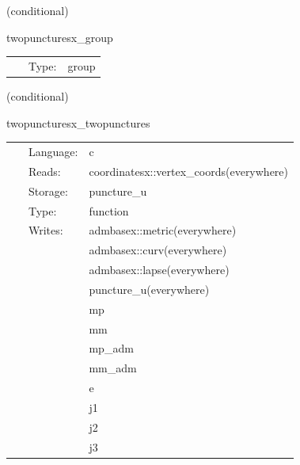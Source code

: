\vspace{5mm}

   (conditional) 

\hspace{5mm} twopuncturesx\_group 

\hspace{5mm}{\it twopuncturesx initial data group } 


\hspace{5mm}

 \begin{tabular*}{160mm}{cll} 
~ & Type:  & group \\ 
\end{tabular*} 


\vspace{5mm}

   (conditional) 

\hspace{5mm} twopuncturesx\_twopunctures 

\hspace{5mm}{\it create puncture black hole initial data } 


\hspace{5mm}

 \begin{tabular*}{160mm}{cll} 
~ & Language:  & c \\ 
~ & Reads:  & coordinatesx::vertex\_coords(everywhere) \\ 
~ & Storage:  & puncture\_u \\ 
~ & Type:  & function \\ 
~ & Writes:  & admbasex::metric(everywhere) \\ 
~& ~ &admbasex::curv(everywhere)\\ 
~& ~ &admbasex::lapse(everywhere)\\ 
~& ~ &puncture\_u(everywhere)\\ 
~& ~ &mp\\ 
~& ~ &mm\\ 
~& ~ &mp\_adm\\ 
~& ~ &mm\_adm\\ 
~& ~ &e\\ 
~& ~ &j1\\ 
~& ~ &j2\\ 
~& ~ &j3\\ 
\end{tabular*} 


\vspace{5mm}

